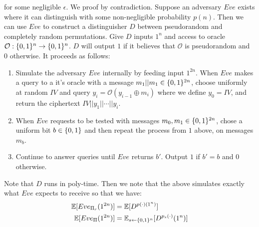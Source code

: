 \documentclass{article}
\begin{document}
\begin{enumerate}
\begin{enumerate}[,label=\alph*.]
for some negligible $\epsilon$. We proof by contradiction. Suppose an adversary $Eve$ exists where
it can distinguish with some non-negligible probability $p(n)$. Then we can use $Eve$ to construct
a distinguisher $D$ between pseudorandom and completely random permutations. Give $D$ inputs
$1^n$ and access to oracle $\mathcal{O}: \{0,1\}^n \to \{0,1\}^n$. $D$ will output $1$ if it believes that
$\mathcal{O}$ is pseudorandom and $0$ otherwise. It proceeds as follows:%

\begin{enumerate}[noitemsep,topsep=\mdcompacttopsep]%

\item{}Simulate the adversary $Eve$ internally by feeding input $1^{2n}$. When $Eve$ makes a query
to a it's oracle with a message $m_1 || m_1 \in \{0,1\}^{2n}$, choose uniformly at random $IV$ and
query $y_i = \mathcal{O}(y_{i-1} \oplus m_i)$ where we define $y_0 = IV$, and return the ciphertext
$IV || y_1 || \cdots || y_i$.%

\item{}When $Eve$ requests to be tested with messages $m_0,m_1 \in \{0,1\}^{2n}$, chose a uniform bit
$b \in \{0,1\}$ and then repeat the process from $1$ above, on messages $m_b$.%

\item{}Continue to answer queries until $Eve$ returns $b'$. Output $1$ if $b' = b$ and $0$ otherwise.%
\end{enumerate}%

Note that $D$ runs in poly-time. Then we note that the above simulates exactly what $Eve$ expects to
receive so that we have:%
\noindent\noindent\[%
\begin{aligned}
\E[Eve_{\Pi_r}(1^{2n})] &= \E[D^{p(\cdot)(1^n)}] \\
\E[Eve_{\Pi}(1^{2n})] &= \E_{s \gets \zo^n} [D^{p_s(\cdot)}(1^n)]
\end{aligned}
\]%


\end{enumerate}
\end{enumerate}
\end{document}
